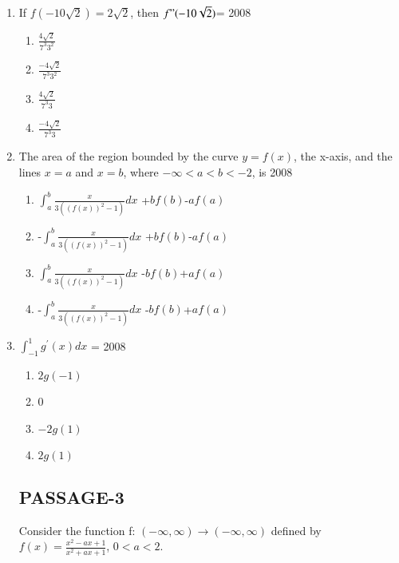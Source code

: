 \documentclass[journal,12pt,onecolumn]{IEEEtran}
\theoremstyle{remark}
\begin{document}
\begin{enumerate}
\item If $f(-10\sqrt{2})=2\sqrt{2}$, then $f"(-10\sqrt{2})$=
\hfill{2008}
\begin{enumerate}
    \item $\frac{4\sqrt{2}}{7^3 3^2}$
    \item $\frac{-4\sqrt{2}}{7^3 3^2}$ 
     \item $\frac{4\sqrt{2}}{7^3 3}$  
     \item $\frac{-4\sqrt{2}}{7^3 3}$ 
\end{enumerate}
\item The area of the region bounded by the curve $y=f(x)$, the x-axis, and the lines $x = a$ and $x = b$, where $-\infty <a<b<-2$, is
\hfill{2008}
\begin{enumerate}
    \item $\int_a^b\frac{x}{3((f(x))^2-1)}dx$ +$bf(b)$-$af(a)$ 
    \item -$\int_a^b\frac{x}{3((f(x))^2-1)}dx$ +$bf(b)$-$af(a)$
    \item $\int_a^b\frac{x}{3((f(x))^2-1)}dx$ -$bf(b)$+$af(a)$ 
    \item -$\int_a^b\frac{x}{3((f(x))^2-1)}dx$ -$bf(b)$+$af(a)$ 
\end{enumerate}
\item $\int_ {-1}^{1} g^{\prime}(x)dx$ =
\hfill{2008}
\begin{enumerate}
    \item $2g(-1)$
    \item 0
    \item $-2g(1)$
    \item $2g(1)$ 
\end{enumerate}
\subsection{PASSAGE-3}
Consider the function f: $(-\infty,\infty)\rightarrow(-\infty,\infty)$ defined by $f(x)=\frac{x^2 -ax+1}{x^2+ax+1}$, $ 0<a<2.$


\end{enumerate}
\end{document}
